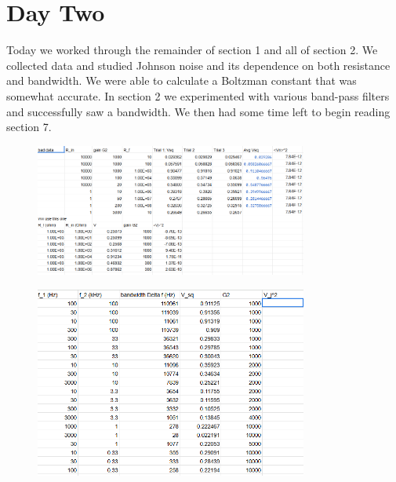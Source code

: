 \documentclass{article}
\begin{document}
\section*{Day Two}
Today we worked through the remainder of section 1 and all of section 2. We collected data and studied Johnson noise and its dependence on both resistance and bandwidth. We were able to calculate a Boltzman constant that was somewhat accurate. In section 2 we experimented with various band-pass filters and successfully saw a bandwidth. We then had some time left to begin reading section 7. 
\begin{figure}[h]
    \centering
    \includegraphics[width=0.8\textwidth]{lab_notebook/day2.PNG}
   
    \label{Section 1 data}
\end{figure}
\begin{figure}[h]
    \centering
    \includegraphics[width=0.8\textwidth]{lab_notebook/day2-2.PNG}
   
    \label{Section 1 data}
\end{figure}
\end{document}
